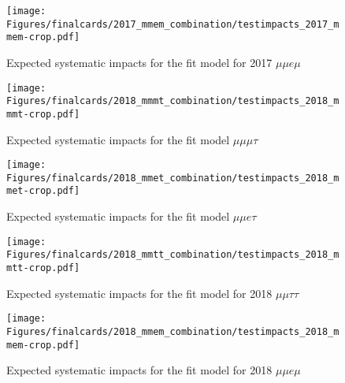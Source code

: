 \begin{figure}[ht!b]
    \centering 
\texttt{[image: Figures/finalcards/2017\_mmem\_combination/testimpacts\_2017\_mmem-crop.pdf]}
    \caption{\label{fig:impacts_2017_mmem} Expected systematic impacts for the fit model for 2017 $\mu\mu e \mu$}
\end{figure}

\begin{figure}[ht!b]
    \centering 
\texttt{[image: Figures/finalcards/2018\_mmmt\_combination/testimpacts\_2018\_mmmt-crop.pdf]}
    \caption{\label{fig:impacts_2018_mmmt} Expected systematic impacts for the fit model $\mu\mu\mu\tau$}
\end{figure}

\begin{figure}[ht!b]
    \centering 
\texttt{[image: Figures/finalcards/2018\_mmet\_combination/testimpacts\_2018\_mmet-crop.pdf]}
    \caption{\label{fig:impacts_2018_mmet} Expected systematic impacts for the fit model $\mu\mu e \tau$}
\end{figure}

\begin{figure}[ht!b]
    \centering 
\texttt{[image: Figures/finalcards/2018\_mmtt\_combination/testimpacts\_2018\_mmtt-crop.pdf]}
    \caption{\label{fig:impacts_2018_mmtt} Expected systematic impacts for the fit model for 2018 $\mu\mu\tau\tau$}
\end{figure}

\begin{figure}[ht!b]
    \centering 
\texttt{[image: Figures/finalcards/2018\_mmem\_combination/testimpacts\_2018\_mmem-crop.pdf]}
    \caption{\label{fig:impacts_2018_mmem} Expected systematic impacts for the fit model for 2018 $\mu\mu e \mu$}
\end{figure}




